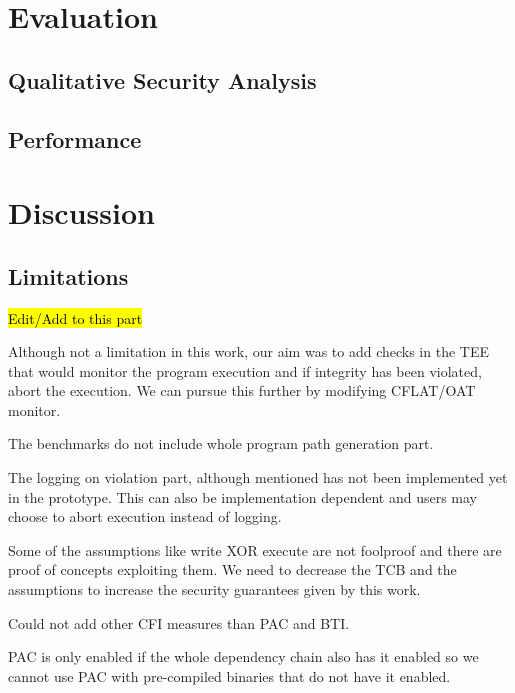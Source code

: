 \documentclass[a4paper, nobind]{templates/ociamthesis}
\begin{document}
\chapter{Evaluation}\label{evaluation}

\minitoc 

\section{Qualitative Security Analysis}\label{qualitative-security-analysis}

\section{Performance}\label{performance}

\chapter{Discussion}\label{discussion}

\minitoc 

\section{Limitations}\label{limitations-2}

\hl{Edit/Add to this part}

Although not a limitation in this work, our aim was to add checks in the TEE
that would monitor the program execution and if integrity has been violated,
abort the execution. We can pursue this further by modifying CFLAT/OAT monitor.

The benchmarks do not include whole program path generation part.

The logging on violation part, although mentioned has not been implemented yet
in the prototype. This can also be implementation dependent and users may choose
to abort execution instead of logging.

Some of the assumptions like write XOR execute are not foolproof and there are
proof of concepts exploiting them. We need to decrease the TCB and the
assumptions to increase the security guarantees given by this work.

Could not add other CFI measures than PAC and BTI.

PAC is only enabled if the whole dependency chain also has it enabled so we
cannot use PAC with pre-compiled binaries that do not have it enabled.
\end{document}
